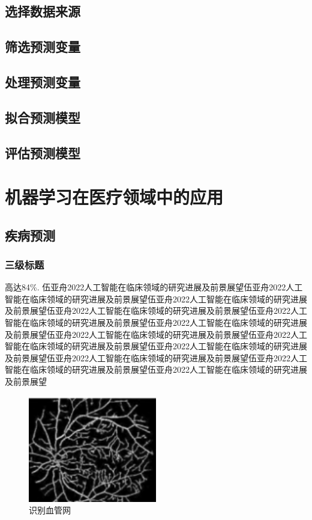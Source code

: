 \documentclass{article}
\begin{document}
    
    \subsection{选择数据来源}

    \subsection{筛选预测变量}
   
    \subsection{处理预测变量}
    

    \subsection{拟合预测模型}
    
    \subsection{评估预测模型}
    
    
\section{机器学习在医疗领域中的应用}

    \subsection{疾病预测}
        \subsubsection{三级标题}
        高达84\%\cite{伍亚舟2022人工智能在临床领域的研究进展及前景展望}. 伍亚舟2022人工智能在临床领域的研究进展及前景展望伍亚舟2022人工智能在临床领域的研究进展及前景展望伍亚舟2022人工智能在临床领域的研究进展及前景展望伍亚舟2022人工智能在临床领域的研究进展及前景展望伍亚舟2022人工智能在临床领域的研究进展及前景展望伍亚舟2022人工智能在临床领域的研究进展及前景展望伍亚舟2022人工智能在临床领域的研究进展及前景展望伍亚舟2022人工智能在临床领域的研究进展及前景展望伍亚舟2022人工智能在临床领域的研究进展及前景展望伍亚舟2022人工智能在临床领域的研究进展及前景展望伍亚舟2022人工智能在临床领域的研究进展及前景展望伍亚舟2022人工智能在临床领域的研究进展及前景展望

    \begin{figure}[h]
        \centering
        \includegraphics[width=0.5\textwidth]{2fig/b.png}
        \caption{识别血管网}
        \label{fig:b}
    \end{figure}
        
\end{document}
